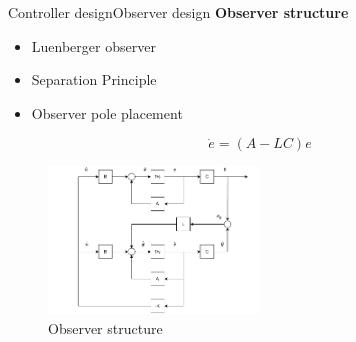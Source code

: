 \begin{frame}{Controller design}{Observer design}
	\textbf{Observer structure}
	\begin{itemize}
		\item Luenberger observer
		\item Separation Principle
		\item Observer pole placement
	\end{itemize}


\begin{equation} \label{eq:obs_error_dot}
	\dot{e} = (A - LC)e
\end{equation}
\begin{figure}[h!]
	\centering
	\includegraphics[width=0.5\textwidth]{../Graphics/Observer_diagram.pdf}
	\caption{Observer structure}
	\label{fig:obs_struct}
\end{figure}
\end{frame}




